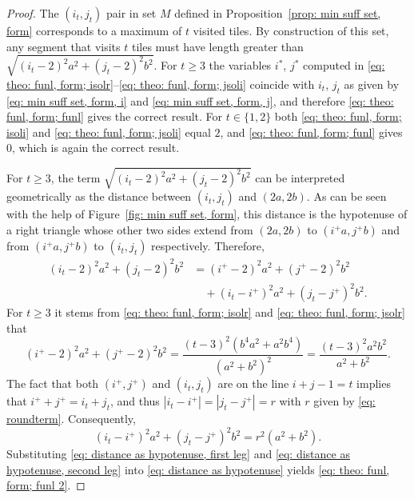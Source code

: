 \documentclass[12pt, a4paper]{article}
\newcommand{\tiles}{t} %
\newcommand{\isolr}{i^+}
\newcommand{\jsolr}{j^+}
\newcommand{\isoli}{i^\ast}
\newcommand{\jsoli}{j^\ast}
\newcommand{\roundterm}{r}
\newcommand{\mss}{M}
\begin{document}
\begin{proof}
The $(i_\tiles,j_\tiles)$ pair in set $\mss$ defined in Proposition~\ref{prop: min suff set, form} corresponds to a maximum of $\tiles$ visited tiles. By construction of this set, any segment that visits $\tiles$ tiles must have length greater than $\sqrt{(i_\tiles-2)^2a^2 + (j_\tiles-2)^2b^2}$. For $\tiles \geq 3$ the variables $\isoli$, $\jsoli$ computed in \eqref{eq: theo: funl, form; isolr}--\eqref{eq: theo: funl, form; jsoli}
coincide with $i_\tiles$, $j_\tiles$ as given by \eqref{eq: min suff set, form, i} and \eqref{eq: min suff set, form, j}, and therefore \eqref{eq: theo: funl, form; funl} gives the correct result. For $\tiles \in \{1, 2\}$ both \eqref{eq: theo: funl, form; isoli} and \eqref{eq: theo: funl, form; jsoli} equal $2$, and \eqref{eq: theo: funl, form; funl} gives $0$, which is again the correct result.

For $\tiles \geq 3$, the term $\sqrt{(i_\tiles-2)^2a^2 + (j_\tiles-2)^2b^2}$ can be interpreted geometrically as the distance between $(i_\tiles, j_\tiles)$ and $(2a, 2b)$. As can be seen with the help of Figure~\ref{fig: min suff set, form}, this distance is the hypotenuse of a right triangle whose other two sides extend from $(2a, 2b)$ to $(\isolr a, \jsolr b)$ and from $(\isolr a, \jsolr b)$ to $(i_\tiles, j_\tiles)$ respectively. Therefore,
\begin{equation}
\label{eq: distance as hypotenuse}
\begin{split}
(i_\tiles-2)^2a^2 + (j_\tiles-2)^2b^2 &= (\isolr-2)^2a^2 + (\jsolr-2)^2b^2 \\
&\quad + (i_\tiles-\isolr)^2a^2 + (j_\tiles-\jsolr)^2b^2.
\end{split}
\end{equation}
For $\tiles \geq 3$ it stems from \eqref{eq: theo: funl, form; isolr}
and \eqref{eq: theo: funl, form; jsolr} that
\begin{equation}
\label{eq: distance as hypotenuse, first leg}
(\isolr-2)^2a^2 + (\jsolr-2)^2b^2 =
\frac{(\tiles-3)^2 (b^4a^2+a^2b^4)}{(a^2+b^2)^2} =
\frac{(\tiles-3)^2 a^2b^2}{a^2+b^2}.
\end{equation}
The fact that both $(\isolr, \jsolr)$ and $(i_\tiles, j_\tiles)$ are on the line $i+j-1=\tiles$ implies that $\isolr+\jsolr = i_\tiles+ j_\tiles$, and thus $|i_\tiles-\isolr| = |j_\tiles-\jsolr| = \roundterm$ with $\roundterm$ given by \eqref{eq: roundterm}. Consequently,
\begin{equation}
\label{eq: distance as hypotenuse, second leg}
(i_\tiles-\isolr)^2a^2 + (j_\tiles-\jsolr)^2b^2 = \roundterm^2 (a^2+b^2).
\end{equation}
Substituting \eqref{eq: distance as hypotenuse, first leg} and \eqref{eq: distance as hypotenuse, second leg} into \eqref{eq: distance as hypotenuse} yields \eqref{eq: theo: funl, form; funl 2}.


\end{proof}
\end{document}
